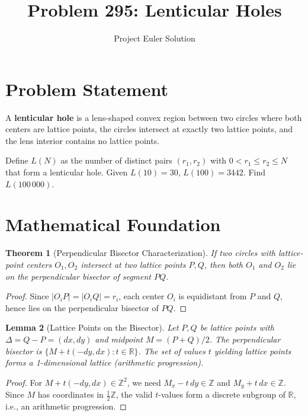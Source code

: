\documentclass[12pt]{article}
\title{Problem 295: Lenticular Holes}
\author{Project Euler Solution}
\date{}
\newtheorem{theorem}{Theorem}
\newtheorem{lemma}[theorem]{Lemma}
\begin{document}
\maketitle

\section{Problem Statement}
A \textbf{lenticular hole} is a lens-shaped convex region between two circles where both centers are lattice points, the circles intersect at exactly two lattice points, and the lens interior contains no lattice points.

Define $L(N)$ as the number of distinct pairs $(r_1, r_2)$ with $0 < r_1 \leq r_2 \leq N$ that form a lenticular hole. Given $L(10) = 30$, $L(100) = 3442$. Find $L(100\,000)$.

\section{Mathematical Foundation}

\begin{theorem}[Perpendicular Bisector Characterization]
If two circles with lattice-point centers $O_1, O_2$ intersect at two lattice points $P, Q$, then both $O_1$ and $O_2$ lie on the perpendicular bisector of segment $PQ$.
\end{theorem}

\begin{proof}
Since $|O_i P| = |O_i Q| = r_i$, each center $O_i$ is equidistant from $P$ and $Q$, hence lies on the perpendicular bisector of $PQ$.
\end{proof}

\begin{lemma}[Lattice Points on the Bisector]
Let $P, Q$ be lattice points with $\Delta = Q - P = (dx, dy)$ and midpoint $M = (P+Q)/2$. The perpendicular bisector is $\{M + t(-dy, dx) : t \in \mathbb{R}\}$. The set of values $t$ yielding lattice points forms a 1-dimensional lattice (arithmetic progression).
\end{lemma}

\begin{proof}
For $M + t(-dy, dx) \in \mathbb{Z}^2$, we need $M_x - t\,dy \in \mathbb{Z}$ and $M_y + t\,dx \in \mathbb{Z}$. Since $M$ has coordinates in $\frac{1}{2}\mathbb{Z}$, the valid $t$-values form a discrete subgroup of $\mathbb{R}$, i.e., an arithmetic progression.
\end{proof}
\end{document}
